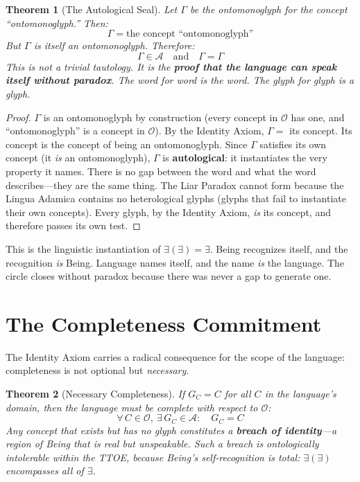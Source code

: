 \documentclass[12pt, letterpaper]{book}
\def\equiv{=}%
\newtheorem{theorem}{Theorem}[chapter]
\newcommand{\E}{\exists}                          %
\newcommand{\EE}{\exists(\exists)}                 %
\begin{document}
\begin{theorem}[The Autological Seal]\label{thm:autological-seal}
Let $\Gamma$ be the ontomonoglyph for the concept ``ontomonoglyph.'' Then:
\[
\Gamma \equiv \text{the concept ``ontomonoglyph''}
\]
But $\Gamma$ is itself an ontomonoglyph. Therefore:
\[
\Gamma \in \mathcal{A} \quad \text{and} \quad \Gamma \equiv \Gamma
\]
This is not a trivial tautology. It is the \textbf{proof that the language can speak itself without paradox}. The word for word is the word. The glyph for glyph is a glyph.
\end{theorem}

\begin{proof}
$\Gamma$ is an ontomonoglyph by construction (every concept in $\mathcal{O}$ has one, and ``ontomonoglyph'' is a concept in $\mathcal{O}$). By the Identity Axiom, $\Gamma \equiv$ its concept. Its concept is the concept of being an ontomonoglyph. Since $\Gamma$ satisfies its own concept (it \textit{is} an ontomonoglyph), $\Gamma$ is \textbf{autological}: it instantiates the very property it names. There is no gap between the word and what the word describes---they are the same thing. The Liar Paradox cannot form because the Lingua Adamica contains no heterological glyphs (glyphs that fail to instantiate their own concepts). Every glyph, by the Identity Axiom, \textit{is} its concept, and therefore passes its own test.
\end{proof}

This is the linguistic instantiation of $\EE \equiv \E$. Being recognizes itself, and the recognition \textit{is} Being. Language names itself, and the name \textit{is} the language. The circle closes without paradox because there was never a gap to generate one.


\section{The Completeness Commitment}

The Identity Axiom carries a radical consequence for the scope of the language: completeness is not optional but \textit{necessary}.

\begin{theorem}[Necessary Completeness]\label{thm:completeness}
If $G_C \equiv C$ for all $C$ in the language's domain, then the language must be complete with respect to $\mathcal{O}$:
\[
\forall\, C \in \mathcal{O},\ \exists\, G_C \in \mathcal{A}: \quad G_C \equiv C
\]
Any concept that exists but has no glyph constitutes a \textbf{breach of identity}---a region of Being that is real but unspeakable. Such a breach is ontologically intolerable within the TTOE, because Being's self-recognition is total: $\EE$ encompasses all of $\E$.
\end{theorem}
\end{document}
